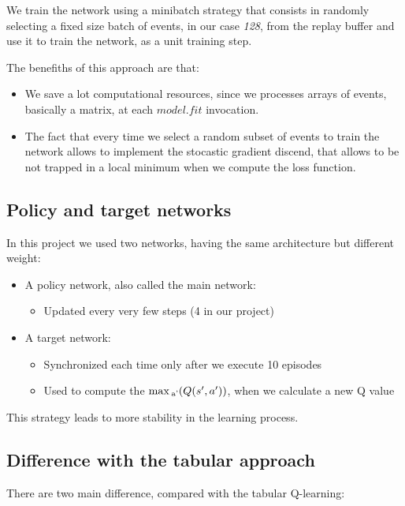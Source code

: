 \documentclass{article}
\begin{document}
We train the network using a minibatch strategy that consists
in randomly selecting a fixed size batch of events,
in our case \emph{128}, from the replay buffer and use it to train the network,
as a unit training step.

The benefiths of this approach are that:

\begin{itemize}
  \item We save a lot computational resources, 
  since we processes arrays of events, basically a matrix, at each $model.fit$ invocation.
  \item The fact that every time we select a random subset of events 
  to train the network allows to implement the stocastic gradient discend, that allows
  to be not trapped in a local minimum when we compute the loss function.
\end{itemize}

\subsection{Policy and target networks}

In this project we used two networks, having the same architecture but different weight:

\begin{itemize}
  \item A policy network, also called the main network:
  \begin{itemize}
    \item{Updated every very few steps (4 in our project)}
  \end{itemize}   
  \item A target network:
  \begin{itemize}
    \item{Synchronized each time only after we execute 10 episodes}
    \item{Used to compute the $\max\textsubscript{a'} (Q(s',a'))$, when we calculate a new Q value}
  \end{itemize} 
\end{itemize}

This strategy leads to more stability in the learning process.

\subsection{Difference with the tabular approach}

There are two main difference, compared with the tabular Q-learning:
\end{document}
